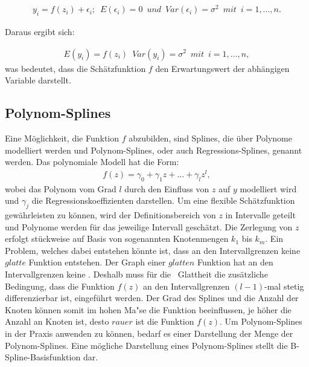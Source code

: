 \documentclass[12pt]{scrreprt}
\begin{document}
\begin{align}
y_{i}=f(z_{i})+\epsilon_{i};\enspace E(\epsilon_{i})=0 \enspace und \enspace Var(\epsilon_{i})=\sigma^2 \enspace mit \enspace i=1,...,n.
\end{align}

Daraus ergibt sich:

\begin{align}
E(y_{i})=f(z_{i}) \enspace Var(y_{i})=\sigma^2 \enspace mit \enspace i=1,...,n,
\end{align}
was bedeutet, dass die Schätzfunktion $f$ den Erwartungswert der abhängigen Variable darstellt.

\subsection{Polynom-Splines}

Eine Möglichkeit, die Funktion $f$ abzubilden, sind Splines, die über Polynome modelliert werden und Polynom-Splines, oder auch Regressions-Splines, genannt werden. Das polynomiale Modell hat die Form: 
\begin{align}
f(z)=\gamma_{0}+\gamma_{1}z+...+\gamma_{l}z^l,
\end{align}
wobei das Polynom vom Grad $l$ durch den Einfluss von $z$ auf $y$ modelliert wird und $\gamma_{j}$ die Regressionskoeffizienten darstellen. Um eine flexible Schätzfunktion gewährleisten zu können, wird der Definitionsbereich von $z$ in Intervalle geteilt und Polynome werden für das jeweilige Intervall geschätzt. Die Zerlegung von $z$ erfolgt stückweise auf Basis von sogenannten Knotenmengen $k_{1}$ bis $k_{m}$.  Ein Problem, welches dabei entstehen könnte ist, dass an den Intervallgrenzen keine $glatte$ Funktion entstehen. Der Graph einer $glatten$ Funktion hat an den Intervallgrenzen keine . Deshalb muss für die \grqq ~Glattheit die zusätzliche Bedingung, dass die Funktion $f(z)$ an den Intervallgrenzen $(l-1)$-mal stetig differenzierbar ist, eingeführt werden. Der Grad des Splines und die Anzahl der Knoten können somit im hohen Ma"se die Funktion beeinflussen, je höher die Anzahl an Knoten ist, desto $rauer$ ist die Funktion $f(z)$. Um Polynom-Splines in der Praxis anwenden zu können, bedarf es einer Darstellung der Menge der Polynom-Splines. Eine mögliche Darstellung eines Polynom-Splines stellt die B-Spline-Basisfunktion dar.
\end{document}
